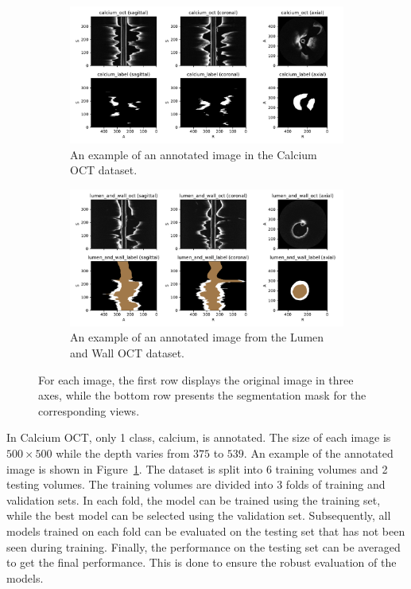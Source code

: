 \documentclass[a4paper,11pt,oneside]{report}
\begin{document}
\begin{figure}[hbt]
    \begin{subfigure}[t]{0.49\textwidth}
        \centering
        \includegraphics[width=1\linewidth]{figures/fig_datasets_calcium_oct_sample.pdf}
        \caption{An example of an annotated image in the Calcium OCT dataset.}
        \label{fig:calcium-oct}
    \end{subfigure}%
    \hfill
    \begin{subfigure}[t]{0.49\textwidth}
        \centering
        \includegraphics[width=1\linewidth]{figures/fig_datasets_law_oct_sample.pdf}
        \caption{An example of an annotated image from the Lumen and Wall OCT dataset.}
        \label{fig:lumen-and-wall-oct}
    \end{subfigure}
    \caption{For each image, the first row displays the original image in three axes, while the bottom row presents the segmentation mask for the corresponding views.}
    \label{fig:enter-label}
\end{figure}

In Calcium OCT, only 1 class, calcium, is annotated. The size of each image is $500\times 500$ while the depth varies from $375$ to $539$. An example of the annotated image is shown in Figure~\ref{fig:calcium-oct}. The dataset is split into 6 training volumes and 2 testing volumes. The training volumes are divided into 3 folds of training and validation sets. In each fold, the model can be trained using the training set, while the best model can be selected using the validation set. Subsequently, all models trained on each fold can be evaluated on the testing set that has not been seen during training. Finally, the performance on the testing set can be averaged to get the final performance. This is done to ensure the robust evaluation of the models.
\end{document}
